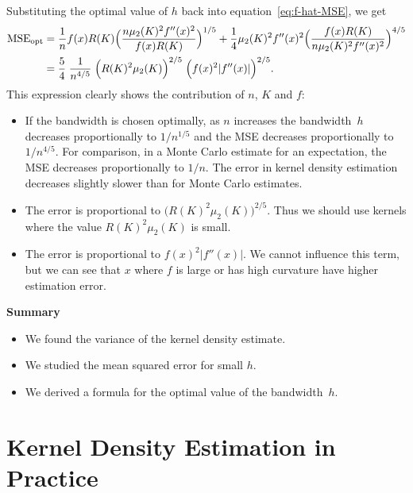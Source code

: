 \documentclass[
  a4paper,
]{article}
\providecommand{\tightlist}{%
  \setlength{\itemsep}{0pt}\setlength{\parskip}{0pt}}
\theoremstyle{definition}
\theoremstyle{definition}
\theoremstyle{definition}
\theoremstyle{definition}
\theoremstyle{remark}
\begin{document}
Substituting the optimal value of \(h\) back into equation~\eqref{eq:f-hat-MSE},
we get
\begin{align*}
  \mathop{\mathrm{MSE}}\nolimits_\mathrm{opt}
  &= \frac{1}{n} f(x) R(K) \Bigl( \frac{n \mu_2(K)^2 f''(x)^2}{f(x) R(K)} \Bigr)^{1/5}
     + \frac14 \mu_2(K)^2 f''(x)^2 \Bigl( \frac{f(x) R(K)}{n \mu_2(K)^2 f''(x)^2} \Bigr)^{4/5} \\
  &= \frac54 \; \frac{1}{n^{4/5}}
      \; \Bigl( R(K)^2 \mu_2(K) \Bigr)^{2/5}
      \; \Bigl( f(x)^2 |f''(x)| \Bigr)^{2/5}.
\end{align*}
This expression clearly shows the contribution of \(n\), \(K\) and \(f\):

\begin{itemize}
\item
  If the bandwidth is chosen optimally, as \(n\) increases the bandwidth~\(h\)
  decreases proportionally to \(1/n^{1/5}\) and the MSE decreases
  proportionally to \(1 / n^{4/5}\). For comparison, in a Monte Carlo
  estimate for an expectation, the MSE decreases proportionally to \(1/n\).
  The error in kernel density estimation decreases slightly slower than
  for Monte Carlo estimates.
\item
  The error is proportional to \(\bigl( R(K)^2 \mu_2(K) \bigr)^{2/5}\).
  Thus we should use kernels where the value \(R(K)^2 \mu_2(K)\)
  is small.
\item
  The error is proportional to \(f(x)^2 |f''(x)|\). We cannot influence
  this term, but we can see that \(x\) where \(f\) is large or has
  high curvature have higher estimation error.
\end{itemize}

\textbf{Summary}

\begin{itemize}
\tightlist
\item
  We found the variance of the kernel density estimate.
\item
  We studied the mean squared error for small \(h\).
\item
  We derived a formula for the optimal value of the bandwidth~\(h\).
\end{itemize}

\clearpage

\hypertarget{X04-practice}{%
\section{Kernel Density Estimation in Practice}\label{X04-practice}}
\end{document}
